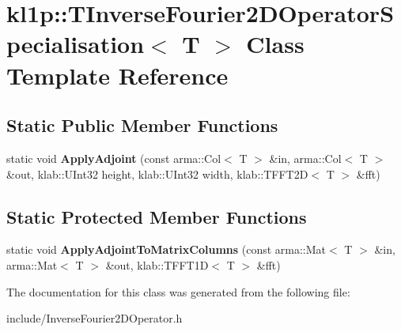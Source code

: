 \hypertarget{classkl1p_1_1TInverseFourier2DOperatorSpecialisation}{}\section{kl1p\+:\+:T\+Inverse\+Fourier2\+D\+Operator\+Specialisation$<$ T $>$ Class Template Reference}
\label{classkl1p_1_1TInverseFourier2DOperatorSpecialisation}
\subsection*{Static Public Member Functions}
\begin{DoxyCompactItemize}
\item 
static void {\bfseries Apply\+Adjoint} (const arma\+::\+Col$<$ T $>$ \&in, arma\+::\+Col$<$ T $>$ \&out, klab\+::\+U\+Int32 height, klab\+::\+U\+Int32 width, klab\+::\+T\+F\+F\+T2D$<$ T $>$ \&fft)\hypertarget{classkl1p_1_1TInverseFourier2DOperatorSpecialisation_a4ae294c57334c18d651ebedc8f3b19d0}{}\label{classkl1p_1_1TInverseFourier2DOperatorSpecialisation_a4ae294c57334c18d651ebedc8f3b19d0}

\end{DoxyCompactItemize}
\subsection*{Static Protected Member Functions}
\begin{DoxyCompactItemize}
\item 
static void {\bfseries Apply\+Adjoint\+To\+Matrix\+Columns} (const arma\+::\+Mat$<$ T $>$ \&in, arma\+::\+Mat$<$ T $>$ \&out, klab\+::\+T\+F\+F\+T1D$<$ T $>$ \&fft)\hypertarget{classkl1p_1_1TInverseFourier2DOperatorSpecialisation_ab1f8ced247b7ec1e5ae55ec2bf6519da}{}\label{classkl1p_1_1TInverseFourier2DOperatorSpecialisation_ab1f8ced247b7ec1e5ae55ec2bf6519da}

\end{DoxyCompactItemize}


The documentation for this class was generated from the following file\+:\begin{DoxyCompactItemize}
\item 
include/Inverse\+Fourier2\+D\+Operator.\+h\end{DoxyCompactItemize}
